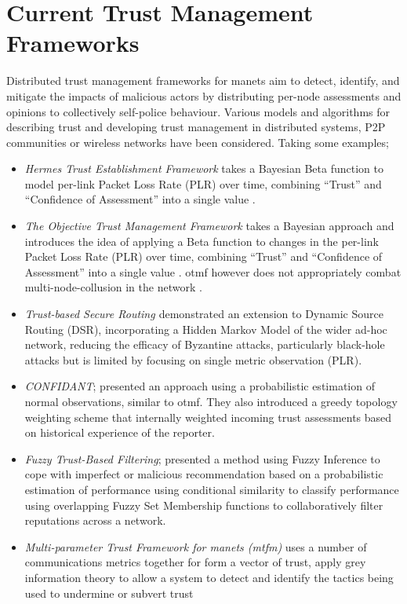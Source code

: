 \section{Current Trust Management Frameworks}
Distributed trust management frameworks for \gls{manet}s aim to detect, identify, and mitigate the impacts of malicious actors by distributing per-node assessments and opinions to collectively self-police behaviour.
Various models and algorithms for describing trust and developing trust management in distributed systems, P2P communities or wireless networks have been considered.
Taking some examples;
\begin{itemize}
  \item \emph{Hermes Trust Establishment Framework} takes a Bayesian Beta function to model per-link Packet Loss Rate (PLR) over time, combining ``Trust'' and ``Confidence of Assessment'' into a single value \cite{Zouridaki2005}.
  \item \emph{The Objective Trust Management Framework} takes a Bayesian approach and introduces the idea of applying a Beta function to changes in the per-link Packet Loss Rate (PLR) over time, combining ``Trust'' and ``Confidence of Assessment'' into a single value \cite{Li2008}.
    \acrshort{otmf} however does not appropriately combat multi-node-collusion in the network \cite{Cho2011}.
  \item \emph{Trust-based Secure Routing \cite{Moe2008a}} demonstrated an extension to Dynamic Source Routing (DSR), incorporating a Hidden Markov Model of the wider ad-hoc network, reducing the efficacy of Byzantine attacks, particularly black-hole attacks but is limited by focusing on single metric observation (PLR)\cite{Cho2011}.
  \item \emph{CONFIDANT}; \cite{Buchegger2002} presented an approach using a probabilistic estimation of normal observations, similar to \acrshort{otmf}.
    They also introduced a greedy topology weighting scheme that internally weighted incoming trust assessments based on historical experience of the reporter.
  \item \emph{Fuzzy Trust-Based Filtering}; \cite{Luo2008} presented a method using Fuzzy Inference to cope with imperfect or malicious recommendation based on a probabilistic estimation of performance using conditional similarity to classify performance using overlapping Fuzzy Set Membership functions to collaboratively filter reputations across a network.
  \item \emph{Multi-parameter Trust Framework for \gls{manet}s (\acrshort{mtfm})} uses a number of communications metrics together for form a vector of trust, apply grey information theory to allow a system to detect and identify the tactics being used to undermine or subvert trust\cite{Guo11}
\end{itemize}
